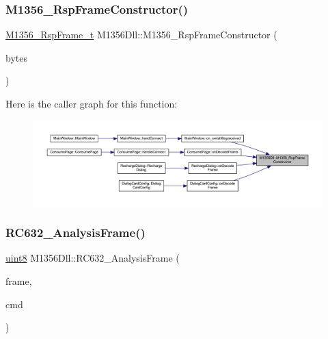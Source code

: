 \subsubsection{\texorpdfstring{M1356\_RspFrameConstructor()}{M1356\_RspFrameConstructor()}}
{\footnotesize\ttfamily \mbox{\hyperlink{struct_m1356___rsp_frame__t}{M1356\+\_\+\+Rsp\+Frame\+\_\+t}} M1356\+Dll\+::\+M1356\+\_\+\+Rsp\+Frame\+Constructor (\begin{DoxyParamCaption}\item[{Q\+Byte\+Array}]{bytes }\end{DoxyParamCaption})}

Here is the caller graph for this function\+:
\nopagebreak
\begin{figure}[H]
\begin{center}
\leavevmode
\includegraphics[width=350pt]{class_m1356_dll_a40131e8263bd201208a37ec1826d5310_icgraph}
\end{center}
\end{figure}
\mbox{\label{class_m1356_dll_a40aed3801baa294bf828c5ab794ef82e}} 
\subsubsection{\texorpdfstring{RC632\_AnalysisFrame()}{RC632\_AnalysisFrame()}}
{\footnotesize\ttfamily \mbox{\hyperlink{m1356dll_8h_adde6aaee8457bee49c2a92621fe22b79}{uint8}} M1356\+Dll\+::\+R\+C632\+\_\+\+Analysis\+Frame (\begin{DoxyParamCaption}\item[{\mbox{\hyperlink{m1356dll_8h_adde6aaee8457bee49c2a92621fe22b79}{uint8}} $\ast$}]{frame,  }\item[{\mbox{\hyperlink{m1356dll_8h_a05f6b0ae8f6a6e135b0e290c25fe0e4e}{uint16}}}]{cmd }\end{DoxyParamCaption})}

\mbox{\label{class_m1356_dll_ab86ae59233d587f4688470796cbb85b1}} 
